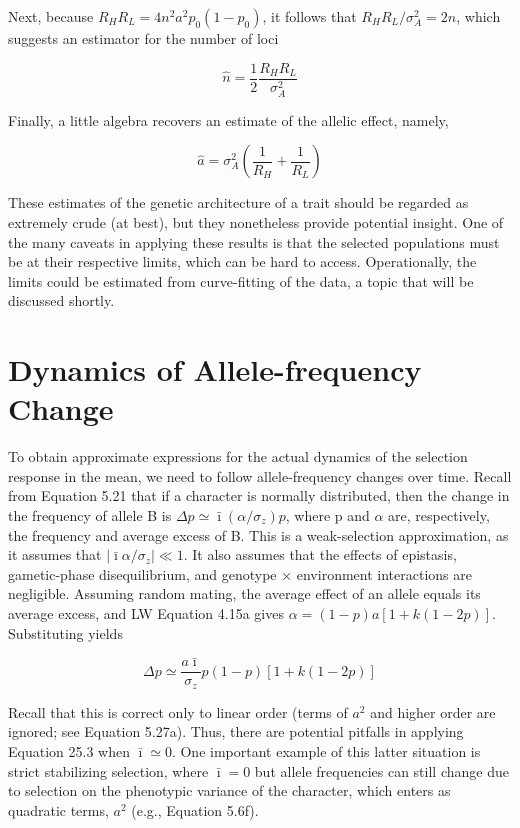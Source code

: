 \documentclass{article}
\begin{document}
Next, because  $ R_H R_L = 4n^2 a^2 p_0 (1 - p_0) $, it follows that  $ R_H R_L / \sigma_A^2 = 2n $, which suggests an estimator for the number of loci

\begin{equation}
\widehat{n}=\frac{1}{2}\frac{R_{H}R_{L}}{\sigma_{A}^{2}}
\tag{25.2e}
\label{eq:25_2e}
\end{equation}

Finally, a little algebra recovers an estimate of the allelic effect, namely,

\begin{equation}
\widehat{a}=\sigma_{A}^{2}\left(\frac{1}{R_{H}}+\frac{1}{R_{L}}\right)
\tag{25.2f}
\label{eq:25_2f}
\end{equation}

These estimates of the genetic architecture of a trait should be regarded as extremely crude (at best), but they nonetheless provide potential insight. One of the many caveats in applying these results is that the selected populations must be at their respective limits, which can be hard to access. Operationally, the limits could be estimated from curve-fitting of the data, a topic that will be discussed shortly.

\section{Dynamics of Allele-frequency Change}
To obtain approximate expressions for the actual dynamics of the selection response in the mean, we need to follow allele-frequency changes over time. Recall from Equation 5.21 that if a character is normally distributed, then the change in the frequency of allele B is  $ \Delta p \simeq \bar{\imath}(\alpha/\sigma_z)p $, where p and  $ \alpha $ are, respectively, the frequency and average excess of B. This is a weak-selection approximation, as it assumes that  $ |\bar{\imath}\alpha/\sigma_z| \ll 1 $. It also assumes that the effects of epistasis, gametic-phase disequilibrium, and genotype × environment interactions are negligible. Assuming random mating, the average effect of an allele equals its average excess, and LW Equation 4.15a gives  $ \alpha = (1 - p)a[1 + k(1 - 2p)] $. Substituting yields

\begin{equation}
\Delta p\simeq\frac{a\bar{\imath}}{\sigma_{z}}p(1-p)[1+k(1-2p)]
\tag{25.3}
\label{eq:25_3}
\end{equation}

Recall that this is correct only to linear order (terms of  $ a^2 $ and higher order are ignored; see Equation 5.27a). Thus, there are potential pitfalls in applying Equation 25.3 when  $ \bar{\imath} \simeq 0 $. One important example of this latter situation is strict stabilizing selection, where  $ \bar{\imath} = 0 $ but allele frequencies can still change due to selection on the phenotypic variance of the character, which enters as quadratic terms,  $ a^2 $ (e.g., Equation 5.6f).
\end{document}
